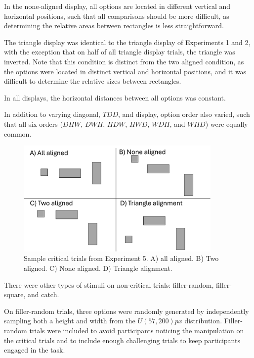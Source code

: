 In the none-aligned display, all options are located in different vertical and horizontal positions, such that all comparisons should be more difficult, as determining the relative areas between rectangles is less straightforward.

The triangle display was identical to the triangle display of Experiments 1 and 2, with the exception that on half of all triangle display trials, the triangle was inverted. Note that this condition is distinct from the two aligned condition, as the options were located in distinct vertical and horizontal positions, and it was difficult to determine the relative sizes between rectangles. 

In all displays, the horizontal distances between all options was constant.

In addition to varying diagonal, $TDD$, and display, option order also varied, such that all six orders ($DHW$, $DWH$, $HDW$, $HWD$, $WDH$, and $WHD$) were equally common.

\begin{figure}
   \begin{center}
      \includegraphics[width=100mm]{figures/comparability_design.jpg}
      \caption{Sample critical trials from Experiment 5. A) all aligned. B) Two aligned. C) None aligned. D) Triangle alignment.}
      \label{fig:comparability_trials}
   \end{center}
\end{figure}

There were other types of stimuli on non-critical trials: filler-random, filler-square, and catch.

On filler-random trials, three options were randomly generated by independently sampling both a height and width from the $U(57,200)px$ distribution. Filler-random trials were included to avoid participants noticing the manipulation on the critical trials and to include enough challenging trials to keep participants engaged in the task.

